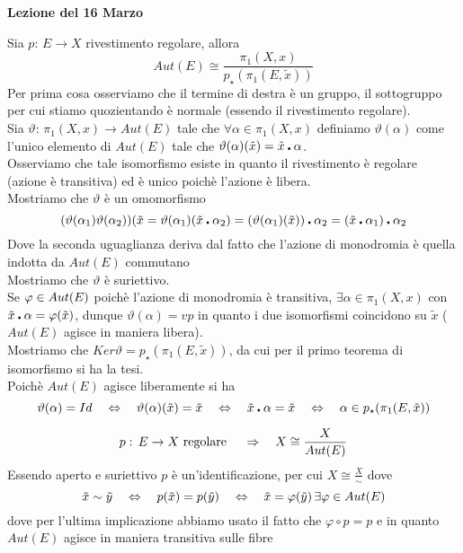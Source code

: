 
\newcommand{\vt}{\vartheta}

\textbf{Lezione del 16  Marzo}

\begin{thm}Sia $p:\, E\to X$ rivestimento regolare, allora
$$ Aut(E) \cong \frac{\pi_1(X,x)}{p_\star(\pi_1(E, \tilde{x}))}$$
\proof Per prima cosa osserviamo che il termine di destra \`e un gruppo, il sottogruppo per cui stiamo quozientando \`e normale (essendo il rivestimento regolare).\\
Sia $\vt:\, \pi_1(X,x)\to Aut(E)$ tale che $\forall \alpha\in \pi_1(X,x)$ definiamo $\vt(\alpha)$ come l'unico elemento di $Aut(E)$ tale che $\vt(\alpha)(\tilde{x})=\tilde{x}\az \alpha$.\\
Osserviamo che tale isomorfismo esiste in quanto il rivestimento \`e regolare (azione \`e transitiva) ed \`e unico poich\`e l'azione \`e libera.\\
Mostriamo che $\vt$ \`e un omomorfismo 
$$ (\vt(\alpha_1)\vt(\alpha_2))(\tilde{x}= \vt(\alpha_1) ( \tilde{x}\az \alpha_2)= (\vt(\alpha_1) (\tilde{x}))\az \alpha_2=(\tilde{x}\az\alpha_1) \az \alpha_2$$
Dove la seconda uguaglianza deriva dal fatto che l'azione di monodromia \`e quella indotta da $Aut(E)$ commutano\\
Mostriamo che $\vt$ \`e suriettivo.\\
Se $\varphi\in Aut(E)$ poich\`e l'azione di monodromia \`e transitiva, $\exists\alpha\in \pi_1(X, x)$ con $\tilde{x}\centerdot \alpha=\varphi(\tilde{x})$, dunque $\vt(\alpha)=vp$ in quanto i due isomorfismi coincidono su $\tilde{x}$ ($Aut(E)$ agisce in maniera libera).\\
Mostriamo che $Ker \vt = p_\star(\pi_1(E, \tilde{x}))$, da cui per il primo teorema di isomorfismo si ha la tesi.\\
Poich\`e $Aut(E)$ agisce liberamente si ha
$$\vt(\alpha)=Id \quad \ses \quad \vt(\alpha)(\tilde{x})=\tilde{x} \quad \ses \quad \tilde{x}\az \alpha =\tilde{x}\quad \ses 
\quad \alpha\in p_\star(\pi_1(E,\tilde{x}))$$
\endproof
\end{thm}
\begin{cor}$$p:\, E\to X \text{  regolare } \quad \Rightarrow \quad X\cong \frac{X}{Aut(E)}$$
\proof Essendo aperto e suriettivo $p$ \`e un'identificazione, per cui $X \cong \frac{X}{\sim}$ dove 
$$\tilde{x}\sim
\tilde{y} \quad \Leftrightarrow \quad p(\tilde{x})=p(\tilde{y}) \quad \Leftrightarrow \quad \tilde{x}=\varphi (\tilde{y}) \, \exists \varphi \in Aut(E)
$$
dove per l'ultima implicazione abbiamo usato il fatto che $\varphi\circ p = p $ e in quanto $Aut(E)$ agisce in maniera transitiva sulle fibre 
\end{cor}
